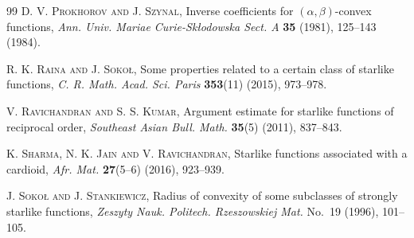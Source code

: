 \documentclass[a4paper,12pt,reqno]{amsart} %
\numberwithin{equation}{section}
\theoremstyle{definition}
\begin{document}
\begin{thebibliography}{99}
	\textsc{D. V. Prokhorov and J. Szynal},
	Inverse coefficients for \((\alpha,\beta)\)-convex functions,
	\textit{Ann. Univ. Mariae Curie-Sk{\l}odowska Sect. A} \textbf{35} (1981), 125--143 (1984).
	
	\textsc{R. K. Raina and J. Soko{\l}},
	Some properties related to a certain class of starlike functions,
	\textit{C. R. Math. Acad. Sci. Paris} \textbf{353}(11) (2015), 973--978.
	
	\textsc{V. Ravichandran and S. S. Kumar},
	Argument estimate for starlike functions of reciprocal order,
	\textit{Southeast Asian Bull. Math.} \textbf{35}(5) (2011), 837--843.
	
	\textsc{K. Sharma, N. K. Jain and V. Ravichandran},
	Starlike functions associated with a cardioid,
	\textit{Afr. Mat.} \textbf{27}(5--6) (2016), 923--939.
	
	\textsc{J. Soko{\l} and J. Stankiewicz},
	Radius of convexity of some subclasses of strongly starlike functions,
	\textit{Zeszyty Nauk. Politech. Rzeszowskiej Mat.} No.~19 (1996), 101--105.
	
\end{thebibliography}
\end{document}

